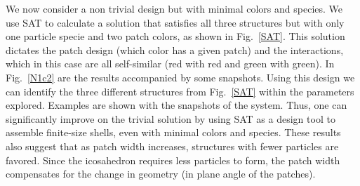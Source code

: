 \documentclass[a4paper, amsfonts, amssymb, amsmath, reprint, showkeys, nofootinbib, twoside]{revtex4-1}
\begin{document}
We now consider a non trivial design but with minimal colors and species. We use SAT to calculate a solution that satisfies all three structures but with only one particle specie and two patch colors, as shown in Fig.~\ref{SAT}. This solution dictates the patch design (which color has a given patch) and the interactions, which in this case are all self-similar (red with red and green with green). In Fig.~\ref{N1c2} are the results accompanied by some snapshots. Using this design we can identify the three different structures from Fig.~\ref{SAT} within the parameters explored. Examples are shown with the snapshots of the system. Thus, one can significantly improve on the trivial solution by using SAT as a design tool to assemble finite-size shells, even with minimal colors and species. These results also suggest that as patch width increases, structures with fewer particles are favored. Since the icosahedron requires less particles to form, the patch width compensates for the change in geometry (in plane angle of the patches).
\end{document}
